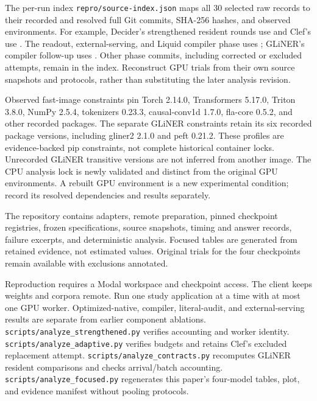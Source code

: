 \documentclass[10pt,twocolumn]{article}
\begin{document}
The per-run index \texttt{repro/source-index.json} maps all 30 selected raw records to their recorded and resolved full Git commits, SHA-256 hashes, and observed environments. For example, Decider's strengthened resident rounds use \texttt{} and Clef's use \texttt{}. The readout, external-serving, and Liquid compiler phase uses \texttt{}; GLiNER's compiler follow-up uses \texttt{}. Other phase commits, including corrected or excluded attempts, remain in the index. Reconstruct GPU trials from their own source snapshots and protocols, rather than substituting the later analysis revision.

Observed fast-image constraints pin Torch 2.14.0, Transformers 5.17.0, Triton 3.8.0, NumPy 2.5.4, tokenizers 0.23.3, causal-conv1d 1.7.0, fla-core 0.5.2, and other recorded packages. The separate GLiNER constraints retain its six recorded package versions, including gliner2 2.1.0 and peft 0.21.2. These profiles are evidence-backed pip constraints, not complete historical container locks. Unrecorded GLiNER transitive versions are not inferred from another image. The CPU analysis lock is newly validated and distinct from the original GPU environments. A rebuilt GPU environment is a new experimental condition; record its resolved dependencies and results separately.

The repository contains adapters, remote preparation, pinned checkpoint registries, frozen specifications, source snapshots, timing and answer records, failure excerpts, and deterministic analysis. Focused tables are generated from retained evidence, not estimated values. Original trials for the four checkpoints remain available with exclusions annotated.

Reproduction requires a Modal workspace and checkpoint access. The client keeps weights and corpora remote. Run one study application at a time with at most one GPU worker. Optimized-native, compiler, literal-audit, and external-serving results are separate from earlier component ablations. \texttt{scripts/analyze\_strengthened.py} verifies accounting and worker identity. \texttt{scripts/analyze\_adaptive.py} verifies budgets and retains Clef's excluded replacement attempt. \texttt{scripts/analyze\_contracts.py} recomputes GLiNER resident comparisons and checks arrival/batch accounting. \texttt{scripts/analyze\_focused.py} regenerates this paper's four-model tables, plot, and evidence manifest without pooling protocols.
\end{document}
